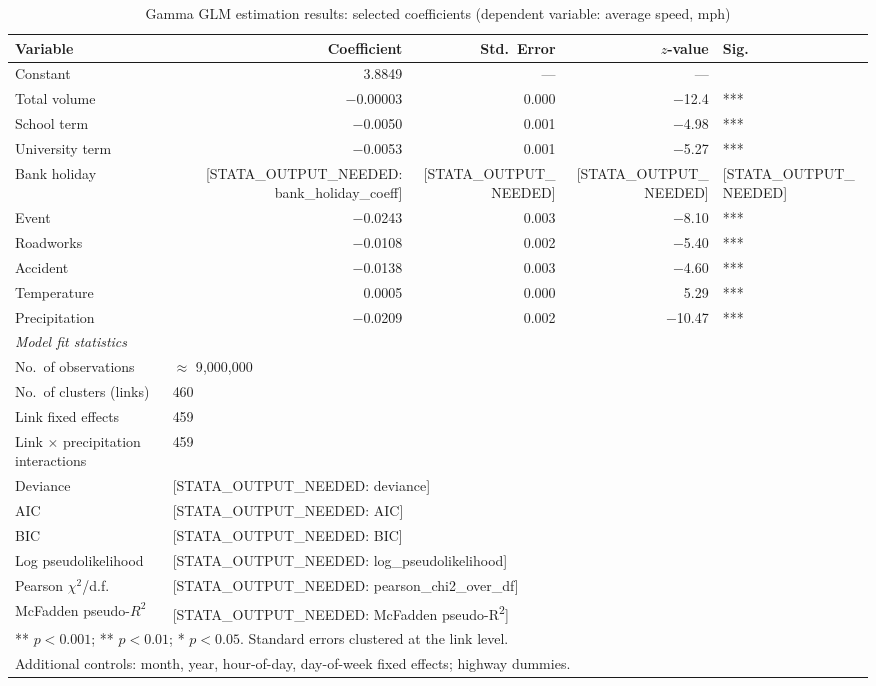 \documentclass[review]{elsarticle}
\begin{document}
\begin{table}[htbp]
\centering
\caption{Gamma GLM estimation results: selected coefficients (dependent variable: average speed, mph)}
\label{tab:glm}
\begin{tabular}{lrrrl}
\toprule
Variable & Coefficient & Std.\ Error & $z$-value & Sig. \\
\midrule
Constant & 3.8849 & --- & --- & \\
Total volume & $-$0.00003 & 0.000 & $-$12.4 & *** \\
School term & $-$0.0050 & 0.001 & $-$4.98 & *** \\
University term & $-$0.0053 & 0.001 & $-$5.27 & *** \\
Bank holiday & [STATA\_OUTPUT\_NEEDED: bank\_holiday\_coeff] & [STATA\_OUTPUT\_NEEDED] & [STATA\_OUTPUT\_NEEDED] & [STATA\_OUTPUT\_NEEDED] \\
Event & $-$0.0243 & 0.003 & $-$8.10 & *** \\
Roadworks & $-$0.0108 & 0.002 & $-$5.40 & *** \\
Accident & $-$0.0138 & 0.003 & $-$4.60 & *** \\
Temperature & 0.0005 & 0.000 & 5.29 & *** \\
Precipitation & $-$0.0209 & 0.002 & $-$10.47 & *** \\
\midrule
\multicolumn{5}{l}{\textit{Model fit statistics}} \\
No.\ of observations & \multicolumn{4}{l}{$\approx$ 9{,}000{,}000} \\
No.\ of clusters (links) & \multicolumn{4}{l}{460} \\
Link fixed effects & \multicolumn{4}{l}{459} \\
Link $\times$ precipitation interactions & \multicolumn{4}{l}{459} \\
Deviance & \multicolumn{4}{l}{[STATA\_OUTPUT\_NEEDED: deviance]} \\
AIC & \multicolumn{4}{l}{[STATA\_OUTPUT\_NEEDED: AIC]} \\
BIC & \multicolumn{4}{l}{[STATA\_OUTPUT\_NEEDED: BIC]} \\
Log pseudolikelihood & \multicolumn{4}{l}{[STATA\_OUTPUT\_NEEDED: log\_pseudolikelihood]} \\
Pearson $\chi^2$/d.f. & \multicolumn{4}{l}{[STATA\_OUTPUT\_NEEDED: pearson\_chi2\_over\_df]} \\
McFadden pseudo-$R^2$ & \multicolumn{4}{l}{[STATA\_OUTPUT\_NEEDED: McFadden pseudo-R\textsuperscript{2}]} \\
\bottomrule
\multicolumn{5}{l}{\footnotesize *** $p < 0.001$; ** $p < 0.01$; * $p < 0.05$. Standard errors clustered at the link level.} \\
\multicolumn{5}{l}{\footnotesize Additional controls: month, year, hour-of-day, day-of-week fixed effects; highway dummies.} \\
\end{tabular}
\end{table}
\end{document}
